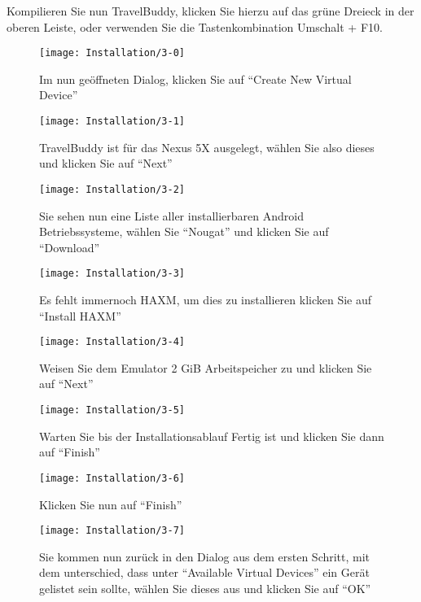 \newpage
{}

Kompilieren Sie nun TravelBuddy, klicken Sie hierzu auf das grüne Dreieck in der oberen Leiste, oder verwenden Sie die Tastenkombination Umschalt + F10.

\begin{figure}
  \centering
  \begin{minipage}[b]{0.48\textwidth}
    \texttt{[image: Installation/3-0]}
    \caption{Im nun geöffneten Dialog, klicken Sie auf ``Create New Virtual Device''}
  \end{minipage}
  \hfill
  \begin{minipage}[b]{0.48\textwidth}
    \texttt{[image: Installation/3-1]}
    \caption{TravelBuddy ist für das Nexus 5X ausgelegt, wählen Sie also dieses und klicken Sie auf ``Next''}
  \end{minipage}
\end{figure}

\begin{figure}
  \centering
  \begin{minipage}[b]{0.48\textwidth}
    \texttt{[image: Installation/3-2]}
    \caption{Sie sehen nun eine Liste aller installierbaren Android Betriebssysteme, wählen Sie ``Nougat'' und klicken Sie auf ``Download''}
  \end{minipage}
  \hfill
  \begin{minipage}[b]{0.48\textwidth}
    \texttt{[image: Installation/3-3]}
    \caption{Es fehlt immernoch HAXM, um dies zu installieren klicken Sie auf ``Install HAXM''}
  \end{minipage}
\end{figure}

\begin{figure}
  \centering
  \begin{minipage}[b]{0.48\textwidth}
    \texttt{[image: Installation/3-4]}
    \caption{Weisen Sie dem Emulator 2 GiB Arbeitspeicher zu und klicken Sie auf ``Next''}
  \end{minipage}
  \hfill
  \begin{minipage}[b]{0.48\textwidth}
    \texttt{[image: Installation/3-5]}
    \caption{Warten Sie bis der Installationsablauf Fertig ist und klicken Sie dann auf ``Finish''}
  \end{minipage}
\end{figure}

\begin{figure}
  \centering
  \begin{minipage}[b]{0.48\textwidth}
    \texttt{[image: Installation/3-6]}
    \caption{Klicken Sie nun auf ``Finish''}
  \end{minipage}
  \hfill
  \begin{minipage}[b]{0.48\textwidth}
    \texttt{[image: Installation/3-7]}
    \caption{Sie kommen nun zurück in den Dialog aus dem ersten Schritt, mit dem unterschied, dass unter ``Available Virtual Devices'' ein Gerät gelistet sein sollte, wählen Sie dieses aus und klicken Sie auf ``OK''}
  \end{minipage}
\end{figure}

